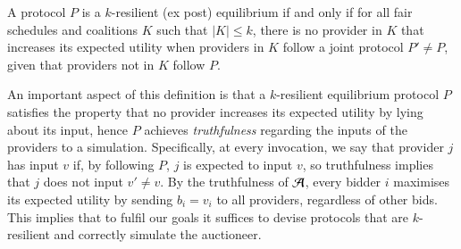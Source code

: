 \begin{definition}
A protocol $P$ is a $k$-resilient (ex post) equilibrium if and only if
for all fair schedules and coalitions $K$ such that $|K| \le k$,
there is no provider in $K$ that increases its expected utility
when providers in $K$ follow a joint protocol $P' \ne P$,
given that providers not in $K$ follow $P$.
\end{definition}

An important aspect of this definition is that a $k$-resilient
equilibrium protocol $P$ satisfies the property that no provider increases
its expected utility by lying about its input, hence $P$
achieves \emph{truthfulness} regarding the inputs of the providers to a simulation.
Specifically, at every invocation, we say that provider $j$ has input $v$
if, by following $P$, $j$ is expected to input $v$, so truthfulness implies that $j$ 
does not input $v' \ne v$.
By the truthfulness of $\mathcal{A}$, every bidder $i$ maximises its expected utility
by sending $b_i = v_i$ to all providers, regardless of other bids.
This implies that to fulfil our goals it suffices to devise
protocols that are $k$-resilient and correctly simulate the auctioneer.

